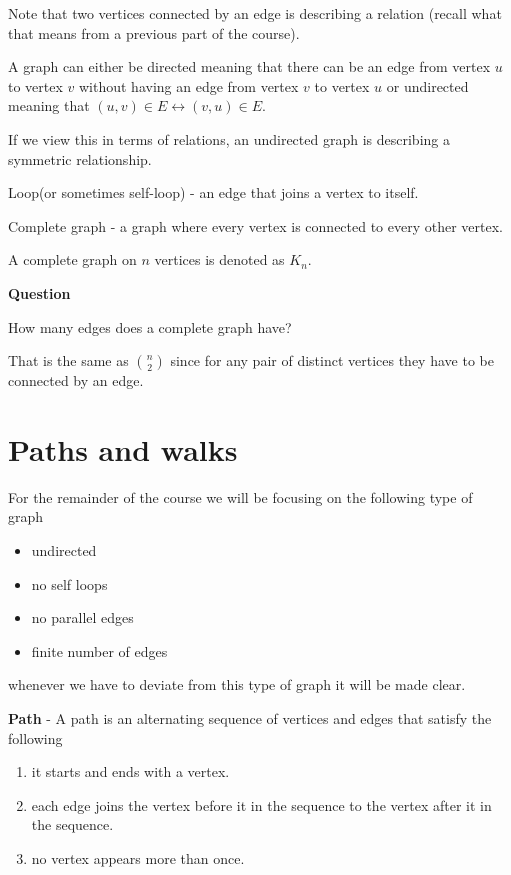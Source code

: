 \documentclass[12pt]{article}
\begin{document}
Note that two vertices connected by an edge is describing a relation (recall what that means from a previous part of the course).

A graph can either be directed meaning that there can be an edge from vertex $u$ to vertex $v$ without having an edge from vertex $v$ to vertex $u$ or undirected meaning that $(u,v) \in E \leftrightarrow (v,u) \in E$.

If we view this in terms of relations, an undirected graph is describing a symmetric relationship.

Loop(or sometimes self-loop) - an edge that joins a vertex to itself.

Complete graph - a graph where every vertex is connected to every other vertex.

A complete graph on $n$ vertices is denoted as $K_n$.

\medskip

\textbf{Question}

How many edges does a complete graph have?

\medskip

That is the same as $\binom{n}{2}$ since for any pair of distinct vertices they have to be connected by an edge.

\section*{Paths and walks}

For the remainder of the course we will be focusing on the following type of graph

\begin{itemize}
\item undirected
\item no self loops
\item no parallel edges
\item finite number of edges
\end{itemize}

whenever we have to deviate from this type of graph it will be made clear.


\textbf{Path} - A path is an alternating sequence of vertices and edges that satisfy the following 

\begin{enumerate}


\item it starts and ends with a vertex.
\item each edge joins the vertex before it in the sequence to the vertex after it in the sequence.
\item no vertex appears more than once.
\end{enumerate}
\end{document}
